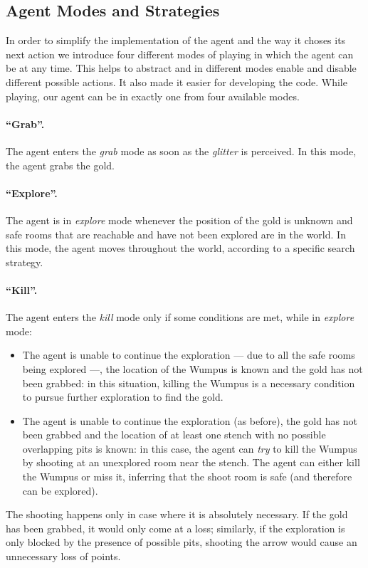 \documentclass{llncs}
\begin{document}

\subsection{Agent Modes and Strategies}

In order to simplify the implementation of the agent and the way it choses its next action we introduce four different modes of playing in which the agent can be at any time. This helps to abstract and in different modes enable and disable different possible actions. It also made it easier for developing the code. 
While playing, our agent can be in exactly one from four available modes.

\paragraph{\enquote{Grab}.} The agent enters the \emph{grab} mode as soon as the \emph{glitter} is perceived. In this mode, the agent grabs the gold.

\paragraph{\enquote{Explore}.} The agent is in \emph{explore} mode whenever the position of the gold is unknown and safe rooms that are reachable and have not been explored are in the world.
In this mode, the agent moves throughout the world, according to a specific search strategy.

\paragraph{\enquote{Kill}.} The agent enters the \emph{kill} mode only if some conditions are met, while in \emph{explore} mode:
\begin{itemize}
	\item The agent is unable to continue the exploration --- due to all the safe rooms being explored ---, the location of the Wumpus is known and the gold has not been grabbed: in this situation, killing the Wumpus is a necessary condition to pursue further exploration to find the gold.
	\item The agent is unable to continue the exploration (as before), the gold has not been grabbed and the location of at least one stench with no possible overlapping pits is known: in this case, the agent can \emph{try} to kill the Wumpus by shooting at an unexplored room near the stench.
	The agent can either kill the Wumpus or miss it, inferring that the shoot room is safe (and therefore can be explored).
\end{itemize}
The shooting happens only in case where it is absolutely necessary.
If the gold has been grabbed, it would only come at a loss; similarly, if the exploration is only blocked by the presence of possible pits, shooting the arrow would cause an unnecessary loss of points.
\end{document}
